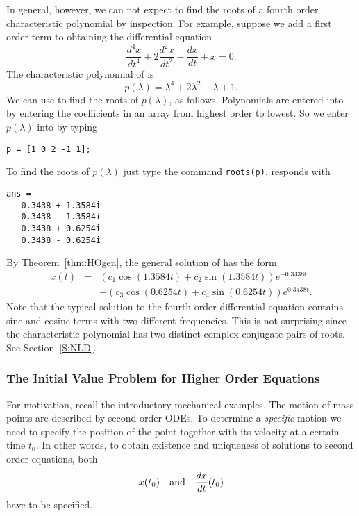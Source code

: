 In general, however, we can not expect to find the roots of a fourth order
characteristic polynomial by inspection.  For example, suppose we add a first
order term to  obtaining the differential equation
\begin{equation}  \label{eq:soex3a}
\frac{d^4x}{dt^4} + 2\frac{d^2x}{dt^2} - \frac{dx}{dt} + x= 0.
\end{equation}
The characteristic polynomial of  is
\[
p(\lambda) = \lambda^4 + 2\lambda^2 - \lambda + 1 .
\]
We can use \Matlab to find the roots of $p(\lambda)$, as follows. 
Polynomials are entered into \Matlab by entering the coefficients in an array
from highest order to lowest.  So we enter $p(\lambda)$ into \Matlab by
typing
\begin{verbatim}
p = [1 0 2 -1 1];
\end{verbatim}
To find the roots of $p(\lambda)$ just type the command {\tt roots(p)}.
\Matlab responds with 
\begin{verbatim}
ans =
  -0.3438 + 1.3584i
  -0.3438 - 1.3584i
   0.3438 + 0.6254i
   0.3438 - 0.6254i
\end{verbatim}
By Theorem~\ref{thm:HOgen}, the general solution of  has the 
form
\[
\begin{array}{rcl}
x(t) & = & (c_1 \cos(1.3584t)+ c_2 \sin(1.3584t))e^{-0.3438t} \\
 & & + (c_3 \cos(0.6254t)+ c_4 \sin(0.6254t))e^{0.3438t}.\end{array}
\]
Note that the typical solution to the fourth order differential equation 
 contains sine and cosine terms with two different 
frequencies.  This is not surprising since the characteristic polynomial 
has two distinct complex conjugate pairs of roots.  See Section~\ref{S:NLD}.


\subsubsection*{The Initial Value Problem for Higher Order Equations}

For motivation, recall the introductory mechanical examples.  The motion 
of mass points are described by second order ODEs.  To determine a 
{\em specific\/} motion we need to specify the position of the point 
together with its velocity at a certain time $t_0$.  In other words, to 
obtain existence and uniqueness of solutions to second order equations, 
both
\[
x(t_0)\quad\mbox{and}\quad \frac{dx}{dt}(t_0)
\]
have to be specified.  

